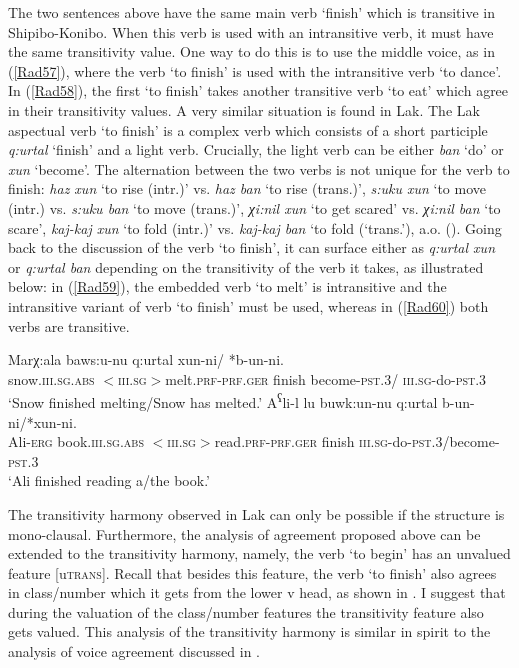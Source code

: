 \documentclass[output=paper]{langscibook}
\begin{document}
The two sentences above have the same main verb ‘finish’ which is transitive in Shipibo-Konibo. When this verb is used with an intransitive verb, it must have the same transitivity value. One way to do this is to use the middle voice, as in (\ref{Rad57}), where the verb ‘to finish’ is used with the intransitive verb ‘to dance’. In (\ref{Rad58}), the first ‘to finish’ takes another transitive verb ‘to eat’ which agree in their transitivity values.
A very similar situation is found in Lak. The Lak aspectual verb ‘to finish’ is a complex verb which consists of a short participle \textit{q:urtal} ‘finish’ and a light verb.  Crucially, the light verb can be either \textit{ban} ‘do’ or \textit{xun} ‘become’. The alternation between the two verbs is not unique for the verb to finish: \textit{haz xun} ‘to rise (intr.)’ vs. \textit{haz ban} ‘to rise (trans.)’, \textit{s:uku xun} ‘to move (intr.) vs. \textit{s:uku ban} ‘to move (trans.)’, \textit{χi:nil xun} ‘to get scared’ vs. \textit{χi:nil ban} ‘to scare’, \textit{kaj-kaj xun} ‘to fold (intr.)’ vs. \textit{kaj-kaj ban} ‘to fold (‘trans.’), a.o. (\citealt[42]{Eldarova1995}). Going back to the discussion of the verb ‘to finish’, it can surface either as \textit{q:urtal xun} or \textit{q:urtal ban} depending on the transitivity of the verb it takes, as illustrated below: in (\ref{Rad59}), the embedded verb ‘to melt’ is intransitive and the intransitive variant of verb ‘to finish’ must be used, whereas in (\ref{Rad60}) both verbs are transitive.

\ea\label{Rad59}
\gll Marχ:ala baws:u-nu q:urtal xun-ni/ *b-un-ni.\\
 snow.\textsc{iii.sg.abs} \textsc{$<$iii.sg$>$}melt.\textsc{prf-prf.ger} finish become-\textsc{pst.3}/ \textsc{iii.sg}-do-\textsc{pst.3}\\
\glt ‘Snow finished melting/Snow has melted.’
\ex\label{Rad60}
\gll A\textsuperscript{ʕ}li-l lu buwk:un-nu q:urtal b-un-ni/*xun-ni.\\
Ali-\textsc{erg} book.\textsc{iii.sg.abs} \textsc{$<$iii.sg$>$}read.\textsc{prf-prf.ger} finish \textsc{iii.sg}-do-\textsc{pst.3}/become-\textsc{pst.3}\\
\glt ‘Ali finished reading a/the book.’
\z 

The transitivity harmony observed in Lak can only be possible if the structure is mono-clausal. Furthermore, the analysis of agreement proposed above can be extended to the transitivity harmony, namely, the verb ‘to begin’ has an unvalued feature [u\textsc{trans}]. Recall that besides this feature, the verb ‘to finish’ also agrees in class/number which it gets from the lower v head, as shown in . I suggest that during the valuation of the class/number features the transitivity feature also gets valued. This analysis of the transitivity harmony is similar in spirit to the analysis of voice agreement discussed in \citet{WurmbrandShimamura2017}.
\end{document}
